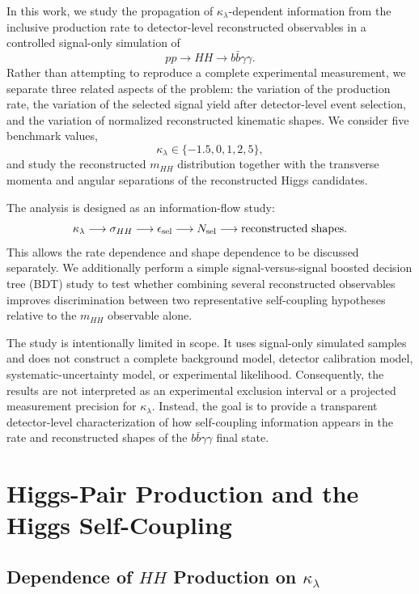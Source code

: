 \documentclass[11pt,a4paper]{article}
\begin{document}
In this work, we study the propagation of $\kappa_\lambda$-dependent information from the inclusive production rate to detector-level reconstructed observables in a controlled signal-only simulation of
\[
pp\to HH\to b\bar b\gamma\gamma.
\]
Rather than attempting to reproduce a complete experimental measurement, we separate three related aspects of the problem: the variation of the production rate, the variation of the selected signal yield after detector-level event selection, and the variation of normalized reconstructed kinematic shapes. We consider five benchmark values,
\[
\kappa_\lambda\in\{-1.5,0,1,2,5\},
\]
and study the reconstructed $m_{HH}$ distribution together with the transverse momenta and angular separations of the reconstructed Higgs candidates.

The analysis is designed as an information-flow study:
\[
\kappa_\lambda
\longrightarrow
\sigma_{HH}
\longrightarrow
\epsilon_{\rm sel}
\longrightarrow
N_{\rm sel}
\longrightarrow
\text{reconstructed shapes}.
\]
This allows the rate dependence and shape dependence to be discussed separately. We additionally perform a simple signal-versus-signal boosted decision tree (BDT) study to test whether combining several reconstructed observables improves discrimination between two representative self-coupling hypotheses relative to the $m_{HH}$ observable alone.

The study is intentionally limited in scope. It uses signal-only simulated samples and does not construct a complete background model, detector calibration model, systematic-uncertainty model, or experimental likelihood. Consequently, the results are not interpreted as an experimental exclusion interval or a projected measurement precision for $\kappa_\lambda$. Instead, the goal is to provide a transparent detector-level characterization of how self-coupling information appears in the rate and reconstructed shapes of the $b\bar b\gamma\gamma$ final state.


\section{Higgs-Pair Production and the Higgs Self-Coupling}

\subsection{\texorpdfstring{Dependence of $HH$ Production on $\kappa_\lambda$}{Dependence of HH Production on kappa-lambda}}
\end{document}
